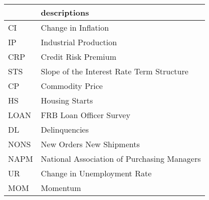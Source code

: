 \begin{tabular}{ll}
\toprule
{} &                                 descriptions \\
\midrule
CI   &                          Change in Inflation \\
IP   &                        Industrial Production \\
CRP  &                          Credit Risk Premium \\
STS  &    Slope of the Interest Rate Term Structure \\
CP   &                              Commodity Price \\
HS   &                               Housing Starts \\
LOAN &                      FRB Loan Officer Survey \\
DL   &                                Delinquencies \\
NONS &                     New Orders New Shipments \\
NAPM &  National Association of Purchasing Managers \\
UR   &                  Change in Unemployment Rate \\
MOM  &                                     Momentum \\
\bottomrule
\end{tabular}
